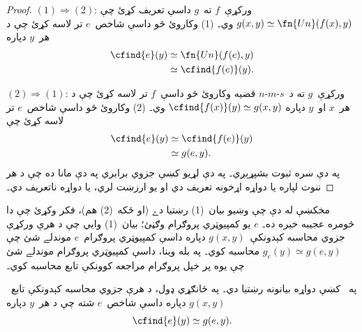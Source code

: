 \documentclass[../../../include/open-logic-section]{subfiles}
\begin{document}
\begin{proof}
$(1) \Rightarrow (2)$: ورکړې~$f$ ته~$g$ داسې تعريف کړئ چې
$g(x,y) \simeq \fn{Un}(f(x),y)$ وي۔ (1) وکاروئ څو داسې شاخص~$e$
تر لاسه کړئ چې د هر~$y$ دپاره
\begin{align*}
\cfind{e}(y) & \simeq \fn{Un}(f(e),y) \\
& \simeq \cfind{f(e)}(y).
\end{align*}

$(2) \Rightarrow (1)$: ورکړې~$g$ ته د~$s$-$m$-$n$ قضيه وکاروئ څو
داسې~$f$ تر لاسه کړئ چې د هر~$x$ او~$y$ دپاره
$\cfind{f(x)}(y) \simeq g(x,y)$ وي۔ (2) وکاروئ څو داسې شاخص~$e$ تر
لاسه کړئ چې
\begin{align*}
\cfind{e}(y) & \simeq \cfind{f(e)}(y) \\
& \simeq g(e,y).
\end{align*}
په دې سره ثبوت بشپړېږي۔
په دې لړيو کښې جزوي برابري په دې مانا ده چې د هر ننوت لپاره
يا دواړه اړخونه تعريف دي او يو ارزښت لري، يا دواړه ناتعريف دي۔
\end{proof}

\begin{explain}
مخکښې له دې چې وښيو بيان~(1) رښتيا دے (او ځکه~(2) هم)، فکر وکړئ چې
دا څومره عجيبه خبره ده۔ $e$ يو کمپيوټري پروګرام وګڼئ؛ بيان~(1) وايي
چې د هرې ورکړې جزوي محاسبه کېدونکې~$g(x,y)$ دپاره داسې کمپيوټري
پروګرام~$e$ موندلے شئ چې $g_e(y) \simeq g(e,y)$ محاسبه کوي۔ په بله
وينا، داسې کمپيوټري پروګرام موندلے شئ چې يوه پر خپل پروګرام مراجعه
کوونکې تابع محاسبه کوي۔
\end{explain}

\begin{thm}
په~ کښې دواړه بيانونه رښتيا دي۔ په ځانګړي
ډول، د هرې جزوي محاسبه کېدونکې تابع~$g(x,y)$ دپاره داسې شاخص~$e$
شته چې د هر~$y$ دپاره
\[
\cfind{e}(y) \simeq g(e,y).
\]
\end{thm}
\end{document}
